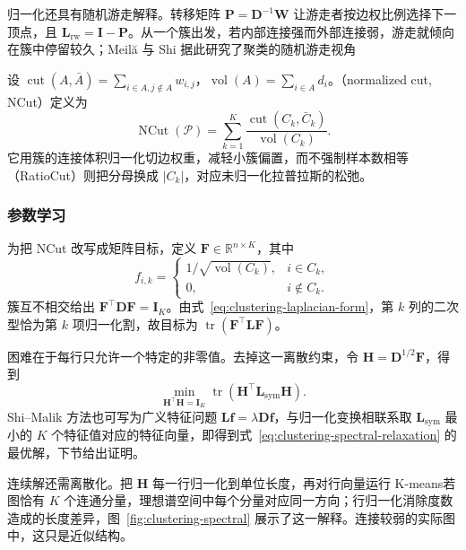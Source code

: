 归一化还具有随机游走解释。转移矩阵 $\bm{P}=\bm{D}^{-1}\bm{W}$ 让游走者按边权比例选择下一顶点，且 $\bm{L}_{\mathrm{rw}}=\bm{I}-\bm{P}$。从一个簇出发，若内部连接强而外部连接弱，游走就倾向在簇中停留较久；Meilă 与 Shi 据此研究了聚类的随机游走视角

设 $\operatorname{cut}(A,\bar A)=\sum_{i\in A,j\notin A}w_{i,j}$，$\operatorname{vol}(A)=\sum_{i\in A}d_i$。（normalized cut, NCut）定义为
\begin{equation}
 \operatorname{NCut}(\mathcal{P})
 =\sum_{k=1}^K
 \frac{\operatorname{cut}(C_k,\bar C_k)}
      {\operatorname{vol}(C_k)}.
 \label{eq:clustering-ncut}
\end{equation}
它用簇的连接体积归一化切边权重，减轻小簇偏置，而不强制样本数相等（RatioCut）则把分母换成 $|C_k|$，对应未归一化拉普拉斯的松弛。

\subsubsection{参数学习}

为把 NCut 改写成矩阵目标，定义 $\bm{F}\in\mathbb{R}^{n\times K}$，其中
\[
 f_{i,k}=
 \begin{cases}
  1/\sqrt{\operatorname{vol}(C_k)},&i\in C_k,\\
  0,&i\notin C_k.
 \end{cases}
\]
簇互不相交给出 $\bm{F}^{\top}\bm{D}\bm{F}=\bm{I}_K$。由式~\eqref{eq:clustering-laplacian-form}，第 $k$ 列的二次型恰为第 $k$ 项归一化割，故目标为 $\operatorname{tr}(\bm{F}^{\top}\bm{L}\bm{F})$。

困难在于每行只允许一个特定的非零值。去掉这一离散约束，令 $\bm{H}=\bm{D}^{1/2}\bm{F}$，得到
\begin{equation}
 \min_{\bm{H}^{\top}\bm{H}=\bm{I}_K}
 \operatorname{tr}(\bm{H}^{\top}
                   \bm{L}_{\mathrm{sym}}\bm{H}).
 \label{eq:clustering-spectral-relaxation}
\end{equation}
Shi--Malik 方法也可写为广义特征问题 $\bm{L}\bm{f}=\lambda\bm{D}\bm{f}$，与归一化变换相联系取 $\bm{L}_{\mathrm{sym}}$ 最小的 $K$ 个特征值对应的特征向量，即得到式~\eqref{eq:clustering-spectral-relaxation} 的最优解，下节给出证明。

连续解还需离散化。把 $\bm{H}$ 每一行归一化到单位长度，再对行向量运行 K-means若图恰有 $K$ 个连通分量，理想谱空间中每个分量对应同一方向；行归一化消除度数造成的长度差异，图~\ref{fig:clustering-spectral} 展示了这一解释。连接较弱的实际图中，这只是近似结构。

